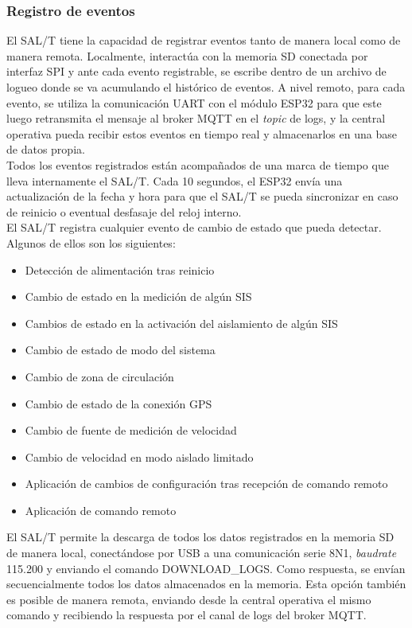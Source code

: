 \subsubsection{Registro de eventos}

El SAL/T tiene la capacidad de registrar eventos tanto de manera local como de manera remota. Localmente, interactúa con la memoria SD conectada por interfaz SPI y ante cada evento registrable, se escribe dentro de un archivo de logueo donde se va acumulando el histórico de eventos. A nivel remoto, para cada evento, se utiliza la comunicación UART con el módulo ESP32 para que este luego retransmita el mensaje al broker MQTT en el \textit{topic} de logs, y la central operativa pueda recibir estos eventos en tiempo real y almacenarlos en una base de datos propia. \\

Todos los eventos registrados están acompañados de una marca de tiempo que lleva internamente el SAL/T. Cada 10 segundos, el ESP32 envía una actualización de la fecha y hora para que el SAL/T se pueda sincronizar en caso de reinicio o eventual desfasaje del reloj interno. \\ 

El SAL/T registra cualquier evento de cambio de estado que pueda detectar. Algunos de ellos son los siguientes: 
\begin{itemize}
    \item Detección de alimentación tras reinicio
    \item Cambio de estado en la medición de algún SIS
    \item Cambios de estado en la activación del aislamiento de algún SIS
    \item Cambio de estado de modo del sistema
    \item Cambio de zona de circulación
    \item Cambio de estado de la conexión GPS
    \item Cambio de fuente de medición de velocidad
    \item Cambio de velocidad en modo aislado limitado    
    \item Aplicación de cambios de configuración tras recepción de comando remoto
    \item Aplicación de comando remoto
\end{itemize}

El SAL/T permite la descarga de todos los datos registrados en la memoria SD de manera local, conectándose por USB a una comunicación serie 8N1, \textit{baudrate} 115.200 y enviando el comando DOWNLOAD\_LOGS. Como respuesta, se envían secuencialmente todos los datos almacenados en la memoria. Esta opción también es posible de manera remota, enviando desde la central operativa el mismo comando y recibiendo la respuesta por el canal de logs del broker MQTT. 